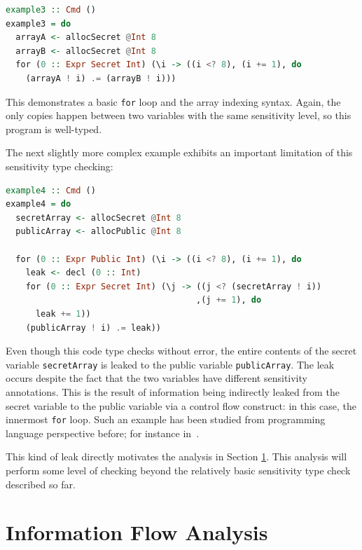 \documentclass[10pt, conference]{IEEEtran}
\newcommand{\ttt}{\texttt}
\begin{document}
\begin{lstlisting}[language=Haskell]
example3 :: Cmd ()
example3 = do
  arrayA <- allocSecret @Int 8
  arrayB <- allocSecret @Int 8
  for (0 :: Expr Secret Int) (\i -> ((i <? 8), (i += 1), do
    (arrayA ! i) .= (arrayB ! i)))
\end{lstlisting}

\noindent This demonstrates a basic \ttt{for} loop and the array indexing syntax. Again, the
only copies happen between two variables with the same sensitivity level, so this
program is well-typed.

The next slightly more complex example exhibits an important limitation of this sensitivity type checking:

\begin{lstlisting}[language=Haskell]
example4 :: Cmd ()
example4 = do
  secretArray <- allocSecret @Int 8
  publicArray <- allocPublic @Int 8

  for (0 :: Expr Public Int) (\i -> ((i <? 8), (i += 1), do
    leak <- decl (0 :: Int)
    for (0 :: Expr Secret Int) (\j -> ((j <? (secretArray ! i))
                                      ,(j += 1), do
      leak += 1))
    (publicArray ! i) .= leak))
\end{lstlisting}

\noindent Even though this code type checks without error, the entire contents of the secret variable \ttt{secretArray} is leaked
to the public variable \ttt{publicArray}. The leak occurs despite the fact that the two variables have different
sensitivity annotations. This is the
result of information being indirectly leaked from the secret variable to the
public variable via a control flow construct: in this case, the innermost \ttt{for} loop. Such an example has been studied from programming language perspective before; for instance
in~\cite{InfoFlowAnalysis}.

This kind of leak directly motivates the analysis in Section \ref{sec:Analysis}. This analysis will perform
some level of checking beyond the relatively basic sensitivity type check described so far.

\section{Information Flow Analysis}
\label{sec:Analysis}
\end{document}
